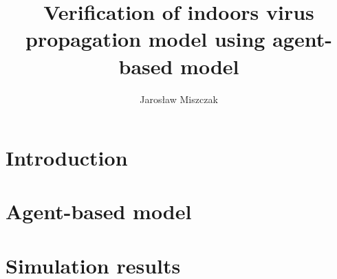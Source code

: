 \documentclass[11pt,a4paper]{article}
\title{Verification of indoors virus propagation model using agent-based model}
\author{Jarosław Miszczak}
\begin{document}
\maketitle

\section{Introduction}


\section{Agent-based model}


\section{Simulation results}
\end{document}
